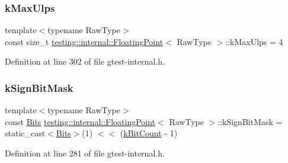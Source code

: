 \subsubsection{\texorpdfstring{k\+Max\+Ulps}{kMaxUlps}}
{\footnotesize\ttfamily template$<$typename Raw\+Type$>$ \\
const size\+\_\+t \hyperlink{classtesting_1_1internal_1_1FloatingPoint}{testing\+::internal\+::\+Floating\+Point}$<$ Raw\+Type $>$\+::k\+Max\+Ulps = 4\hspace{0.3cm}{\ttfamily [static]}}



Definition at line 302 of file gtest-\/internal.\+h.

\mbox{\label{classtesting_1_1internal_1_1FloatingPoint_aca98b5ea6f2222a66a82e52421682efa}} 
\subsubsection{\texorpdfstring{k\+Sign\+Bit\+Mask}{kSignBitMask}}
{\footnotesize\ttfamily template$<$typename Raw\+Type$>$ \\
const \hyperlink{classtesting_1_1internal_1_1FloatingPoint_abf228bf6cd48f12c8b44c85b4971a731}{Bits} \hyperlink{classtesting_1_1internal_1_1FloatingPoint}{testing\+::internal\+::\+Floating\+Point}$<$ Raw\+Type $>$\+::k\+Sign\+Bit\+Mask = static\+\_\+cast$<$\hyperlink{classtesting_1_1internal_1_1FloatingPoint_abf228bf6cd48f12c8b44c85b4971a731}{Bits}$>$(1) $<$$<$ (\hyperlink{classtesting_1_1internal_1_1FloatingPoint_ab819d2e8f93e9e482373999f0f8d71b9}{k\+Bit\+Count} -\/ 1)\hspace{0.3cm}{\ttfamily [static]}}



Definition at line 281 of file gtest-\/internal.\+h.

\mbox{\label{classtesting_1_1internal_1_1FloatingPoint_a2e0b6bd427248b91476f3fca281f7104}} 
